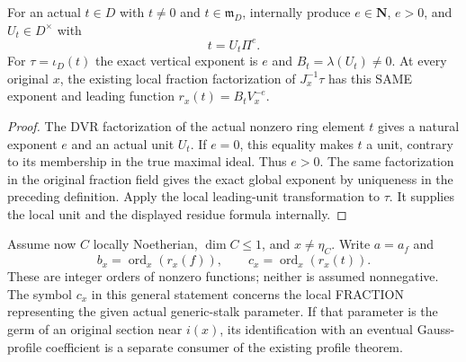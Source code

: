 \begin{lemma}
\label{lem:gauss-leading-original-parameter-positive-order}
\leanok
For an actual $t\in D$ with $t\ne0$ and $t\in\mathfrak m_D$, internally
produce $e\in\mathbf N$, $e>0$, and $U_t\in D^\times$ with
\[
 t=U_t\Pi^e.
\]
For $\tau=\iota_D(t)$ the exact vertical exponent is $e$ and
$B_t=\lambda(U_t)\ne0$. At every original $x$, the existing local
fraction factorization of $J_x^{-1}\tau$ has this SAME exponent and
leading function
$r_x(t)=B_tV_x^{-e}$.
\end{lemma}
\begin{proof}
The DVR factorization of the actual nonzero ring element $t$ gives a
natural exponent $e$ and an actual unit $U_t$. If $e=0$, this equality
makes $t$ a unit, contrary to its membership in the true maximal ideal.
Thus $e>0$. The same factorization in the original fraction field gives
the exact global exponent by uniqueness in the preceding definition.
Apply the local leading-unit transformation to $\tau$. It supplies the
local unit and the displayed residue formula internally.
\end{proof}

Assume now $C$ locally Noetherian, $\dim C\le1$, and $x\ne\eta_C$.
Write $a=a_f$ and
\[
 b_x=\operatorname{ord}_x(r_x(f)),\qquad
 c_x=\operatorname{ord}_x(r_x(t)).
\]
These are integer orders of nonzero functions; neither is assumed
nonnegative. The symbol $c_x$ in this general statement concerns the
local FRACTION representing the given actual generic-stalk parameter.
If that parameter is the germ of an original section near $i(x)$, its
identification with an eventual Gauss-profile coefficient is a separate
consumer of the existing profile theorem.

